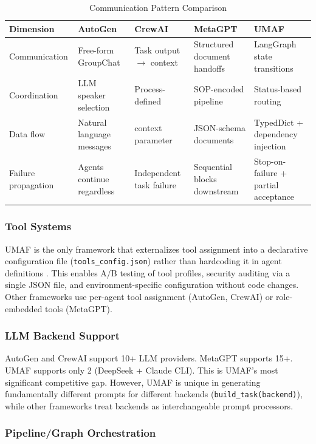 \begin{table}[H]
\centering
\small
\caption{Communication Pattern Comparison}
\label{tab:comm}
\begin{tabular}{@{}p{2.2cm}p{3cm}p{3cm}p{3cm}p{3cm}@{}}
\toprule
\textbf{Dimension} & \textbf{AutoGen} & \textbf{CrewAI} & \textbf{MetaGPT} & \textbf{UMAF} \\
\midrule
Communication & Free-form GroupChat & Task output $\rightarrow$ context & Structured document handoffs & LangGraph state transitions \\
Coordination & LLM speaker selection & Process-defined & SOP-encoded pipeline & Status-based routing \\
Data flow & Natural language messages & context parameter & JSON-schema documents & TypedDict + dependency injection \\
Failure propagation & Agents continue regardless & Independent task failure & Sequential blocks downstream & Stop-on-failure + partial acceptance \\
\bottomrule
\end{tabular}
\end{table}

\subsubsection{Tool Systems}

UMAF is the only framework that externalizes tool assignment into a declarative configuration file (\texttt{tools\_config.json}) rather than hardcoding it in agent definitions \cite{a2a,diagrid}. This enables A/B testing of tool profiles, security auditing via a single JSON file, and environment-specific configuration without code changes. Other frameworks use per-agent tool assignment (AutoGen, CrewAI) or role-embedded tools (MetaGPT).

\subsubsection{LLM Backend Support}

AutoGen and CrewAI support 10+ LLM providers. MetaGPT supports 15+. UMAF supports only 2 (DeepSeek + Claude CLI). This is UMAF's most significant competitive gap. However, UMAF is unique in generating fundamentally different prompts for different backends (\texttt{build\_task(backend)}), while other frameworks treat backends as interchangeable prompt processors.

\subsubsection{Pipeline/Graph Orchestration}


